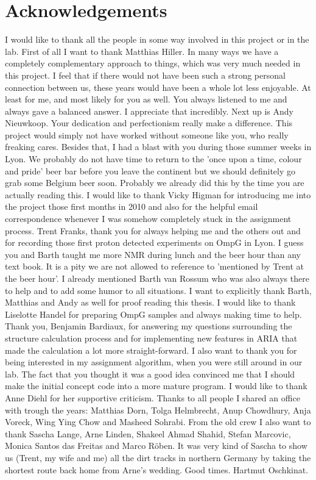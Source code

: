 
\frontmatter

\chapter*{Acknowledgements}



I would like to thank all the people in some way involved in this project or in the lab. First of all I want to thank Matthias Hiller. In many ways we have a completely complementary approach to things, which was very much needed in this project. I feel that if there would not have been such a strong personal connection between us, these years would have been a whole lot less enjoyable. At least for me, and most likely for you as well. You always listened to me and always gave a balanced answer. I appreciate that incredibly. Next up is Andy Nieuwkoop. Your dedication and perfectionism really make a difference. This project would simply not have worked without someone like you, who really freaking cares. Besides that, I had a blast with you during those summer weeks in Lyon. We probably do not have time to return to the 'once upon a time, colour and pride' beer bar before you leave the continent but we should definitely go grab some Belgium beer soon. Probably we already did this by the time you are actually reading this. I would like to thank Vicky Higman for introducing me into the project those first months in 2010 and also for the helpful email correspondence whenever I was somehow completely stuck in the assignment process. Trent Franks, thank you for always helping me and the others out and for recording those first proton detected experiments on OmpG in Lyon. I guess you and Barth taught me more NMR during lunch and the beer hour than any text book. It is a pity we are not allowed to reference to 'mentioned by Trent at the beer hour'. I already mentioned Barth van Rossum who was also always there to help and to add some humor to all situations. I want to explicitly thank Barth, Matthias and Andy as well for proof reading this thesis. I would like to thank Liselotte Handel for preparing OmpG samples and always making time to help. Thank you, Benjamin Bardiaux, for answering my questions surrounding the structure calculation process and for implementing new features in ARIA that made the calculation a lot more straight-forward. I also want to thank you for being interested in my assignment algorithm, when you were still around in our lab. The fact that you thought it was a good idea convinced me that I should make the initial concept code into a more mature program. I would like to thank Anne Diehl for her supportive criticism.
Thanks to all people I shared an office with trough the years: Matthias Dorn, Tolga Helmbrecht, Anup Chowdhury, Anja Voreck, Wing Ying Chow and Masheed Sohrabi. From the old crew I also want to thank Sascha Lange, Arne Linden, Shakeel Ahmad Shahid, Stefan Marcovic, Monica Santos das Freitas and Marco Röben. It was very kind of Sascha to show us (Trent, my wife and me) all the dirt tracks in northern Germany by taking the shortest route back home from Arne's wedding. Good times. Hartmut Oschkinat.


